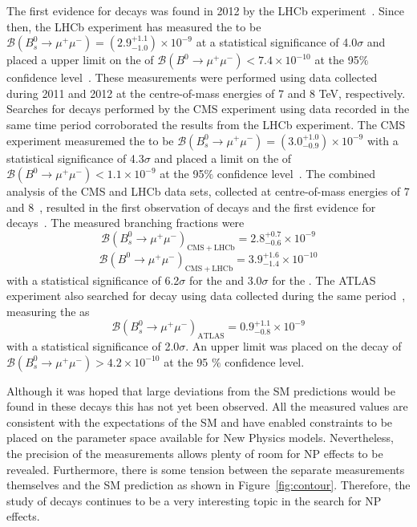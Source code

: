 The first evidence for \bsmumu decays was found in 2012 by the LHCb experiment~\cite{Aaij:2012nna}. Since then,
the LHCb experiment has measured the \bsmumu \BF to be $\mathcal{B}(B^{0}_{s} \to \mu^+ \mu^-) = (2.9^{+1.1}_{-1.0})\times 10^{-9}$ at a statistical significance of 4.0$\sigma$ and placed a upper limit on the \bdmumu \BF of $\mathcal{B}(B^{0} \to \mu^+ \mu^-) < 7.4 \times 10^{-10}$ at the 95$\%$ confidence level~\cite{Aaij:2013aka}. These measurements were performed using data collected during 2011 and 2012 at the centre-of-mass energies of 7 and 8 TeV, respectively. Searches for \bmumu decays performed by the CMS experiment using data recorded in the same time period corroborated the results from the LHCb experiment. The CMS experiment measuremed the \bsmumu \BF to be $\mathcal{B}(B^{0}_{s} \to \mu^+ \mu^-) = (3.0^{+1.0}_{-0.9})\times 10^{-9}$ with a statistical significance of 4.3$\sigma$ and placed a limit on the \bdmumu \BF of $\mathcal{B}(B^{0} \to \mu^+ \mu^-) < 1.1 \times 10^{-9}$ at the 95$\%$ confidence level~\cite{Chatrchyan:2013bka}. 
The combined analysis of the CMS and LHCb data sets, collected at centre-of-mass energies of 7 and 8~\tev, resulted in the first observation of \bsmumu decays and the first evidence for \bdmumu decays~\cite{CMS:2014xfa}. The measured branching fractions were 
\begin{equation}
\mathcal{B}(B^{0}_{s} \to \mu^+ \mu^-)_{\mathrm{CMS + LHCb}}  = 2.8^{+0.7}_{-0.6} \times 10^{-9}
\end{equation}
\begin{equation}
\mathcal{B}(B^{0} \to \mu^+ \mu^-)_{\mathrm{CMS + LHCb}}  = 3.9^{+1.6}_{-1.4} \times 10^{-10}
\end{equation}
with a statistical significance of 6.2$\sigma$ for the \bs and 3.0$\sigma$ for the \bd. The ATLAS experiment also searched for \bmumu decay using data collected during the same period~\cite{Aaboud:2016ire}, measuring the \bsmumu \BF as 
\begin{equation}
\mathcal{B}(B^{0}_{s} \to \mu^+ \mu^-)_{\mathrm{ATLAS}}  = 0.9^{+1.1}_{-0.8} \times 10^{-9}
\end{equation}
with a statistical significance of 2.0$\sigma$. An upper limit was placed on the \bdmumu decay of $\mathcal{B}(B^{0}_{s} \to \mu^+ \mu^-) >4.2 \times 10^{-10}$ at the 95 $\%$ confidence level.

Although it was hoped that large deviations from the SM predictions would be found in these decays this has not yet been observed. 
All the measured values are consistent with the expectations of the SM and have enabled constraints to be placed on the parameter space available for New Physics models. Nevertheless, the precision of the measurements allows plenty of room for NP effects to be revealed. Furthermore, there is some tension between the separate measurements themselves and the SM prediction as shown in Figure~\ref{fig:contour}. Therefore, the study of \bmumu decays continues to be a very interesting topic in the search for NP effects. 
 
